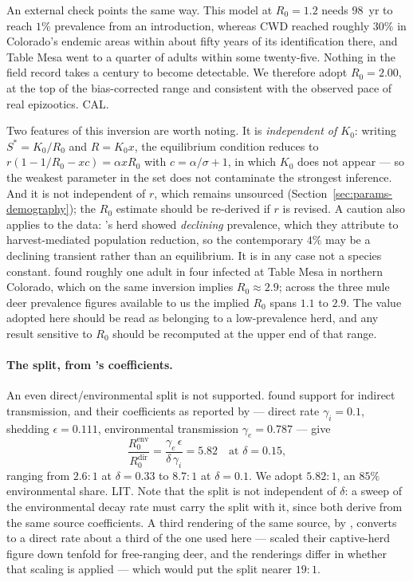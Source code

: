 \documentclass[11pt]{article}
\newcommand{\tagLIT}{{\footnotesize\textsf{\textcolor{green!40!black}{LIT}}}}
\newcommand{\tagCAL}{{\footnotesize\textsf{\textcolor{orange!75!black}{CAL}}}}
\begin{document}
An external check points the same way. This model at $R_0 = 1.2$ needs $98$~yr to reach $1\%$ prevalence from an introduction, whereas CWD reached roughly $30\%$ in Colorado's endemic areas within about fifty years of its identification there, and Table Mesa went to a quarter of adults within some twenty-five. Nothing in the field record takes a century to become detectable. We therefore adopt $R_0 = 2.00$, at the top of the bias-corrected range and consistent with the observed pace of real epizootics. \tagCAL{}.

Two features of this inversion are worth noting. It is \emph{independent of $K_0$}: writing $S^\ast = K_0/R_0$ and $R = K_0 x$, the equilibrium condition reduces to $r(1 - 1/R_0 - xc) = \alpha x R_0$ with $c = \alpha/\sigma + 1$, in which $K_0$ does not appear --- so the weakest parameter in the set does not contaminate the strongest inference. And it is not independent of $r$, which remains unsourced (Section~\ref{sec:params-demography}); the $R_0$ estimate should be re-derived if $r$ is revised. A caution also applies to the data: \citeauthor{Geremia2015}'s herd showed \emph{declining} prevalence, which they attribute to harvest-mediated population reduction, so the contemporary $4\%$ may be a declining transient rather than an equilibrium. It is in any case not a species constant. \citet{Miller2008} found roughly one adult in four infected at Table Mesa in northern Colorado, which on the same inversion implies $R_0 \approx 2.9$; across the three mule deer prevalence figures available to us the implied $R_0$ spans $1.1$ to $2.9$. The value adopted here should be read as belonging to a low-prevalence herd, and any result sensitive to $R_0$ should be recomputed at the upper end of that range.

\paragraph{The split, from \citeauthor{Miller2006}'s coefficients.} An even direct/environmental split is not supported. \citeauthor{Miller2006} found support for indirect transmission, and their coefficients as reported by \citet{SharpPastor2011} --- direct rate $\gamma_i = 0.1$, shedding $\epsilon = 0.111$, environmental transmission $\gamma_e = 0.787$ --- give
\begin{equation}
\frac{R_0^{\mathrm{env}}}{R_0^{\mathrm{dir}}} = \frac{\gamma_e\,\epsilon}{\delta\,\gamma_i} = 5.82 \quad\text{at } \delta = 0.15,
\end{equation}
ranging from $2.6\!:\!1$ at $\delta = 0.33$ to $8.7\!:\!1$ at $\delta = 0.1$. We adopt $5.82\!:\!1$, an $85\%$ environmental share. \tagLIT{}. Note that the split is not independent of $\delta$: a sweep of the environmental decay rate must carry the split with it, since both derive from the same source coefficients. A third rendering of the same source, by \citet{Garlick2013}, converts to a direct rate about a third of the one used here --- \citeauthor{Miller2006} scaled their captive-herd figure down tenfold for free-ranging deer, and the renderings differ in whether that scaling is applied --- which would put the split nearer $19\!:\!1$.
\end{document}
